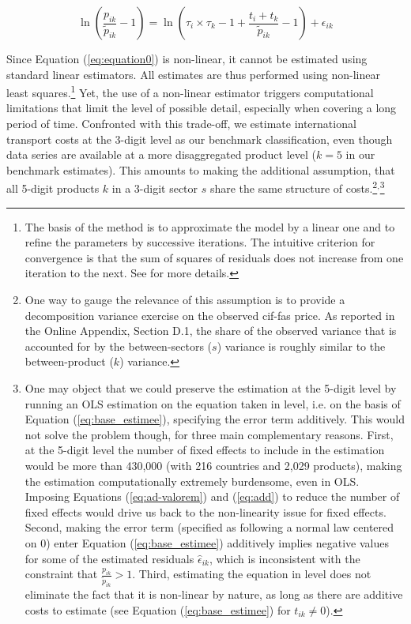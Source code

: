\documentclass[a4paper,11pt]{article}
\begin{document}
\begin{equation}
\ln\left(\frac{p_{ik}}{\widetilde{p}_{ik}}-1 \right)= \ln \left(\tau_{i}\times \tau_{k} -1+\frac{t_{i} + t_{k}}{\widetilde{p}_{ik}}-1 \right) + \epsilon_{ik} \label{eq:equation0}
\end{equation}

Since Equation (\ref{eq:equation0}) is non-linear, it cannot be estimated using standard linear estimators. All estimates are thus performed using non-linear least squares.\footnote{The basis of the method is to approximate the model by a linear one and to refine the parameters by successive iterations. The intuitive criterion for convergence is that the sum of squares of residuals does not increase from one iteration to the next.
See \cite{Woolridge-Book-2001} for more details.} Yet, the use of a non-linear estimator triggers computational limitations that limit the level of possible detail, especially when covering a long period of time.
Confronted with this trade-off, we estimate international transport costs at the 3-digit level as our benchmark classification, even though data series are available at a more disaggregated product level ($k=5$ in our benchmark estimates). This amounts to making the additional assumption, that all 5-digit products $k$ in a 3-digit sector $s$ share the same structure of costs.\footnote{One way to gauge the relevance of this assumption is to provide a decomposition variance exercise on the observed cif-fas price.
As reported in the Online Appendix, Section D.1, the share of the observed variance that is accounted for by the between-sectors ($s$) variance is roughly similar to the between-product ($k$) variance.}$^{,}$\footnote{One may object that we could preserve the estimation at the 5-digit level by running an OLS estimation on the equation taken in level, i.e.
on the basis of Equation (\ref{eq:base_estimee}), specifying the error term additively.
This would not solve the problem though, for three main complementary reasons.
First, at the 5-digit level the number of fixed effects to include in the estimation would be more than 430,000 (with 216 countries and 2,029 products), making the estimation computationally extremely burdensome, even in OLS.
Imposing Equations (\ref{eq:ad-valorem}) and (\ref{eq:add}) to reduce the number of fixed effects would drive us back to the non-linearity issue for fixed effects.
Second, making the error term (specified as following a normal law centered on 0) enter Equation (\ref{eq:base_estimee}) additively implies negative values for some of the estimated residuals $\widehat{\epsilon}_{ik}$, which is inconsistent with the constraint that $\frac{p_{ik}}{\widetilde{p}_{ik}}>1$.
Third, estimating the equation in level does not eliminate the fact that it is non-linear by nature, as long as there are additive costs to estimate (see Equation (\ref{eq:base_estimee}) for $t_{ik} \neq 0$).}
\end{document}
